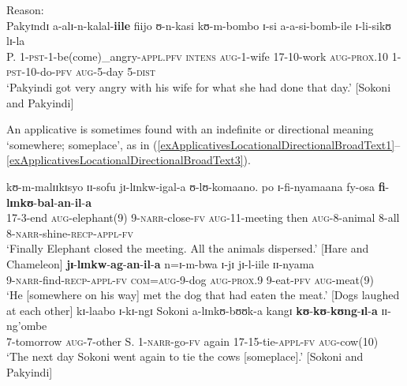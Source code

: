 \begin{exe}

\ex \label{exApplicativeReason1} Reason:\\
\gll Pakyɪndɪ a-alɪ-n-kalal-\textbf{iile} fiijo ʊ-n-kasi kʊ-m-bombo ɪ-si a-a-si-bomb-ile ɪ-li-sikʊ lɪ-la\\
P. 1-\textsc{pst}-1-be(come)\_angry-\textsc{appl.pfv} \textsc{intens} \textsc{aug}-1-wife 17-10-work \textsc{aug}-\textsc{prox.10} 1-\textsc{pst}-10-do-\textsc{pfv} \textsc{aug}-5-day 5-\textsc{dist}\\
\glt \lq Pakyindi got very angry with his wife for what she had done that day.' [Sokoni and Pakyindi]
\end{exe}


An applicative is sometimes found with an indefinite  or directional meaning \lq somewhere; someplace', as in (\ref{exApplicativesLocationalDirectionalBroadText1}--\ref{exApplicativesLocationalDirectionalBroadText3}).


\begin{exe}
\ex \label{exApplicativesLocationalDirectionalBroadText1}
\gll kʊ-m-malɪɪkɪsyo ɪɪ-sofu jɪ-lɪnkw-igal-a ʊ-lʊ-komaano. po ɪ-fi-nyamaana fy-osa \textbf{fi}-\textbf{lɪnkʊ}-\textbf{bal}-\textbf{an}-\textbf{il}-\textbf{a}\\
17-3-end \textsc{aug}-elephant(9) 9-\textsc{narr}-close-\textsc{fv} \textsc{aug}-11-meeting then \textsc{aug}-8-animal 8-all 8-\textsc{narr}-shine-\textsc{recp}-\textsc{appl}-\textsc{fv}\\
\glt \lq Finally Elephant closed the meeting. All the animals dispersed.' [Hare and Chameleon]
\ex \label{exApplicativesLocationalDirectionalBroadText2}
\gll \textbf{jɪ}-\textbf{lɪnkw}-\textbf{ag}-\textbf{an}-\textbf{il}-\textbf{a} n=ɪ-m-bwa ɪ-jɪ jɪ-l-iile ɪɪ-nyama\\
9-\textsc{narr}-find-\textsc{recp}-\textsc{appl}-\textsc{fv} \textsc{com}=\textsc{aug}-9-dog \textsc{aug}-\textsc{prox.9} 9-eat-\textsc{pfv} \textsc{aug}-meat(9)\\
\glt \lq He [somewhere on his way] met the dog that had eaten the meat.' [Dogs laughed at each other]
\ex \label{exApplicativesLocationalDirectionalBroadText3}
\gll kɪ-laabo ɪ-kɪ-ngɪ Sokoni a-lɪnkʊ-bʊʊk-a kangɪ \textbf{kʊ}-\textbf{kʊ}-\textbf{kʊng}-\textbf{ɪl}-\textbf{a} ɪɪ-ng'ombe\\
7-tomorrow \textsc{aug}-7-other S. 1-\textsc{narr}-go-\textsc{fv} again 17-15-tie-\textsc{appl}-\textsc{fv} \textsc{aug}-cow(10)\\
\glt \lq The next day Sokoni went again to tie the cows [someplace].' [Sokoni and Pakyindi]
\end{exe}

